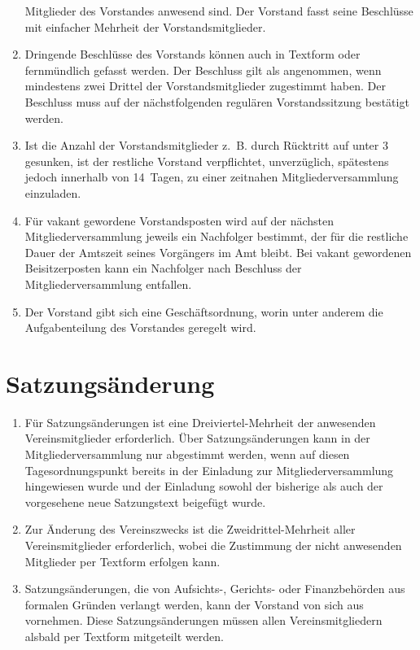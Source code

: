 \documentclass[a4paper,12pt]{scrartcl}
\begin{document}
\begin{enumerate}
    Mitglieder des Vorstandes anwesend sind. Der Vorstand fasst seine Beschlüsse
    mit einfacher Mehrheit der Vorstandsmitglieder.
  \item Dringende Beschlüsse des Vorstands können auch in Textform oder
    fernmündlich gefasst werden. Der Beschluss gilt als angenommen, wenn
    mindestens zwei Drittel der Vorstandsmitglieder zugestimmt haben. Der
    Beschluss muss auf der nächstfolgenden regulären Vorstandssitzung bestätigt
    werden.
  \item Ist die Anzahl der Vorstandsmitglieder z.~B. durch Rücktritt auf unter 3
    gesunken, ist der restliche Vorstand verpflichtet, unverzüglich, spätestens
    jedoch innerhalb von 14~Tagen, zu einer zeitnahen Mitgliederversammlung
    einzuladen.
  \item Für vakant gewordene Vorstandsposten wird auf der nächsten
    Mitgliederversammlung jeweils ein Nachfolger bestimmt, der für die restliche
    Dauer der Amtszeit seines Vorgängers im Amt bleibt. Bei vakant gewordenen
    Beisitzerposten kann ein Nachfolger nach Beschluss der Mitgliederversammlung
    entfallen.
  \item Der Vorstand gibt sich eine Geschäftsordnung, worin unter anderem die
    Aufgabenteilung des Vorstandes geregelt wird.
\end{enumerate}

\section{Satzungsänderung}
\begin{enumerate}
  \item Für Satzungsänderungen ist eine Dreiviertel-Mehrheit der anwesenden
    Vereinsmitglieder erforderlich. Über Satzungsänderungen kann in der
    Mitgliederversammlung nur abgestimmt werden, wenn auf diesen
    Tagesordnungspunkt bereits in der Einladung zur Mitgliederversammlung
    hingewiesen wurde und der Einladung sowohl der bisherige als auch der
    vorgesehene neue Satzungstext beigefügt wurde.
  \item Zur Änderung des Vereinszwecks ist die Zweidrittel-Mehrheit aller
    Vereinsmitglieder erforderlich, wobei die Zustimmung der nicht anwesenden
    Mitglieder per Textform erfolgen kann.
  \item Satzungsänderungen, die von Aufsichts-, Gerichts- oder Finanzbehörden
    aus formalen Gründen verlangt werden, kann der Vorstand von sich aus
    vornehmen. Diese Satzungsänderungen müssen allen Vereinsmitgliedern
    alsbald per Textform mitgeteilt werden.
\end{enumerate}
\end{document}
